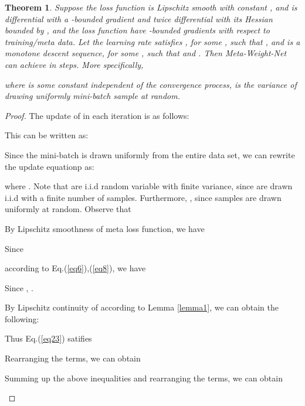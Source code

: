 \documentclass{article}
\newtheorem{theorem}{Theorem}
\begin{document}
	
	
	
	\begin{theorem} \label{th1}
		Suppose the loss function  is Lipschitz smooth with constant , and  is differential with a -bounded gradient and twice differential with its Hessian bounded by , and the loss function  have -bounded gradients with respect to training/meta data. Let the learning rate  satisfies , for some , such that , and  is a monotone descent sequence,  for some , such that  and . Then Meta-Weight-Net can achieve  in  steps. More specifically,
		
		where  is some constant independent of the convergence process,  is the variance of drawing uniformly mini-batch sample at random.
	\end{theorem}
	\begin{proof}
		The update of  in each iteration is as follows:
		
		
		This can be written as:
		
		Since the mini-batch  is drawn uniformly from the entire data set, we can rewrite the update equationp as:
		
		where . Note that  are i.i.d random variable with finite variance, since  are drawn i.i.d with a finite number of samples. Furthermore, , since samples are drawn uniformly at random.
		Observe that
		\begin{tiny}
			
		\end{tiny}
		By Lipschitz smoothness of meta loss function,  we have
		\begin{tiny}
			
		\end{tiny}
		Since \begin{tiny}  \end{tiny} according to Eq.(\ref{eq6}),(\ref{eq8}), we have
		
		Since , .
		
		By Lipschitz continuity of  according to Lemma \ref{lemma1}, we can obtain the following:
		\begin{tiny}
			
		\end{tiny}
		Thus Eq.(\ref{eq23}) satifies
		\begin{tiny}
			
		\end{tiny}
		Rearranging the terms, we can obtain
		\begin{tiny}
			
		\end{tiny}
		Summing up the above inequalities and rearranging the terms, we can obtain
		\begin{tiny}
			

\end{tiny}
\end{proof}
\end{document}
